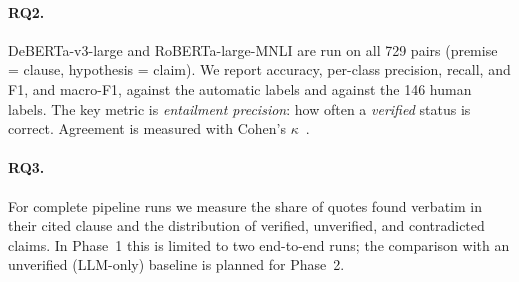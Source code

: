 \paragraph{RQ2.} DeBERTa-v3-large and RoBERTa-large-MNLI are run on all 729 pairs (premise = clause, hypothesis = claim). We report accuracy, per-class precision, recall, and F1, and macro-F1, against the automatic labels and against the 146 human labels. The key metric is \emph{entailment precision}: how often a \emph{verified} status is correct. Agreement is measured with Cohen's $\kappa$~\cite{cohen1960kappa}.

\paragraph{RQ3.} For complete pipeline runs we measure the share of quotes found verbatim in their cited clause and the distribution of verified, unverified, and contradicted claims. In Phase~1 this is limited to two end-to-end runs; the comparison with an unverified (LLM-only) baseline is planned for Phase~2.
